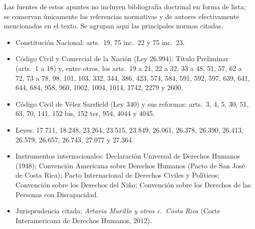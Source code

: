 \documentclass[12pt,oneside]{book}
\begin{document}
Las fuentes de estos apuntes no incluyen bibliografía doctrinal en forma de lista; se conservan únicamente las referencias normativas y de autores efectivamente mencionadas en el texto. Se agrupan aquí las principales normas citadas.

\begin{itemize}
\item Constitución Nacional: arts.~19, 75 inc.~22 y 75 inc.~23.
\item Código Civil y Comercial de la Nación (Ley 26.994): Título Preliminar (arts.~1 a 18) y, entre otros, los arts.~19 a 21, 22 a 32, 33 a 48, 51, 57, 62 a 72, 73 a 78, 98, 101, 103, 332, 344, 386, 423, 574, 584, 591, 592, 597, 639, 641, 644, 684, 958, 960, 1002, 1004, 1014, 1742, 2279 y 2600.
\item Código Civil de Vélez Sarsfield (Ley 340) y sus reformas: arts.~3, 4, 5, 30, 51, 63, 70, 141, 152 bis, 152 ter, 954, 4044 y 4045.
\item Leyes: 17.711, 18.248, 23.264, 23.515, 23.849, 26.061, 26.378, 26.390, 26.413, 26.579, 26.657, 26.743, 27.077 y 27.364.
\item Instrumentos internacionales: Declaración Universal de Derechos Humanos (1948); Convención Americana sobre Derechos Humanos (Pacto de San José de Costa Rica); Pacto Internacional de Derechos Civiles y Políticos; Convención sobre los Derechos del Niño; Convención sobre los Derechos de las Personas con Discapacidad.
\item Jurisprudencia citada: \textit{Artavia Murillo y otros c.\ Costa Rica} (Corte Interamericana de Derechos Humanos, 2012).
\end{itemize}
\end{document}
